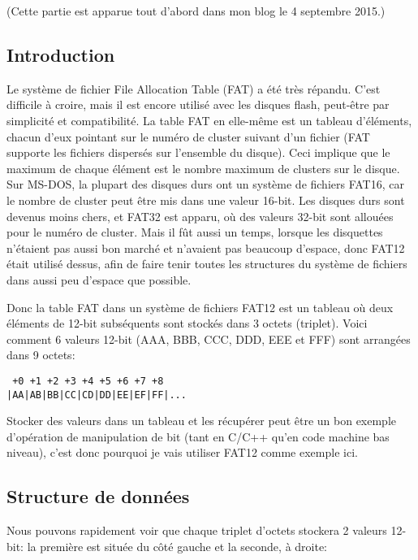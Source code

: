 
(Cette partie est apparue tout d'abord dans mon blog le 4 septembre 2015.)

\subsection{Introduction}

Le système de fichier File Allocation Table (FAT) a été très répandu.
C'est difficile à croire, mais il est encore utilisé avec les disques flash, peut-être
par simplicité et compatibilité.
La table FAT en elle-même est un tableau d'éléments, chacun d'eux pointant sur le
numéro de cluster suivant d'un fichier (FAT supporte les fichiers dispersés sur l'ensemble
du disque).
Ceci implique que le maximum de chaque élément est le nombre maximum de clusters
sur le disque.
Sur MS-DOS, la plupart des disques durs ont un système de fichiers FAT16, car le
nombre de cluster peut être mis dans une valeur 16-bit.
Les disques durs sont devenus moins chers, et FAT32 est apparu, où des valeurs 32-bit
sont allouées pour le numéro de cluster.
Mais il fût aussi un temps, lorsque les disquettes n'étaient pas aussi bon marché
et n'avaient pas beaucoup d'espace, donc FAT12 était utilisé dessus, afin de faire
tenir toutes les structures du système de fichiers dans aussi peu d'espace que possible.

Donc la table FAT dans un système de fichiers FAT12 est un tableau où deux éléments
de 12-bit subséquents sont stockés dans 3 octets (triplet).
Voici comment 6 valeurs 12-bit (AAA, BBB, CCC, DDD, EEE et FFF) sont arrangées dans
9 octets:

\begin{lstlisting}
 +0 +1 +2 +3 +4 +5 +6 +7 +8
|AA|AB|BB|CC|CD|DD|EE|EF|FF|...
\end{lstlisting}

Stocker des valeurs dans un tableau et les récupérer peut être un bon exemple d'opération
de manipulation de bit (tant en C/C++ qu'en code machine bas niveau), c'est donc pourquoi
je vais utiliser FAT12 comme exemple ici.

\subsection{Structure de données}

Nous pouvons rapidement voir que chaque triplet d'octets stockera 2 valeurs 12-bit:
la première est située du côté gauche et la seconde, à droite:

